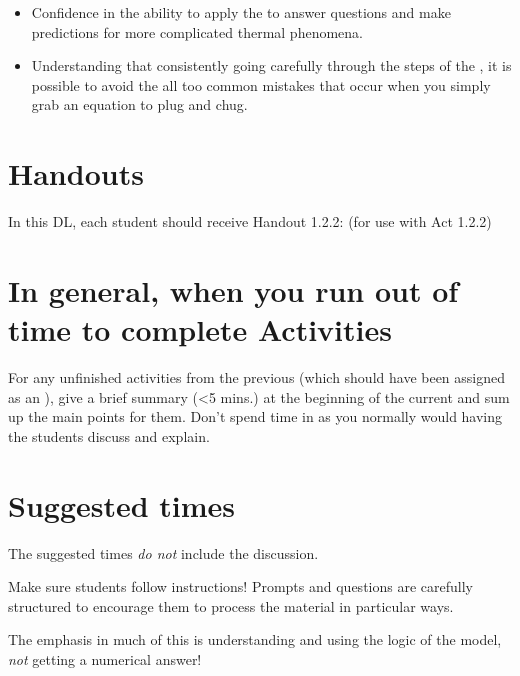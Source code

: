 \begin{itemize}
	\item Confidence in the ability to apply the \EnergyInteractionModel{} to answer questions and make predictions for more complicated thermal phenomena.
	\item Understanding that consistently going carefully through the steps of the \EnergyInteractionModel{}, it is possible to avoid the all too common mistakes that occur when you simply grab an equation to plug and chug.
\end{itemize}

\section*{Handouts}

In this DL, each student should receive Handout 1.2.2:  (for use with Act 1.2.2)

\section*{In general, when you run out of time to complete \DL{} Activities}
	
	For any unfinished \DL{} activities from the previous \DLM (which should have been assigned as an \FNT), give a brief summary (\textless 5 mins.) at the beginning of the current \DLM and sum up the main points for them. Don't spend time in \DL{} as you normally would having the students discuss and explain.
	
\section*{Suggested times}
	
The suggested times {\em do not} include the \WC{} discussion.

\vspace*{1cm}
Make sure students follow instructions! Prompts and questions are carefully structured to encourage them to process the material in particular ways.

\vspace*{1cm}
\begin{mdframed}
The emphasis in much of this \DL{} is understanding and using the logic of the model, {\em not} getting a numerical answer!
\end{mdframed}